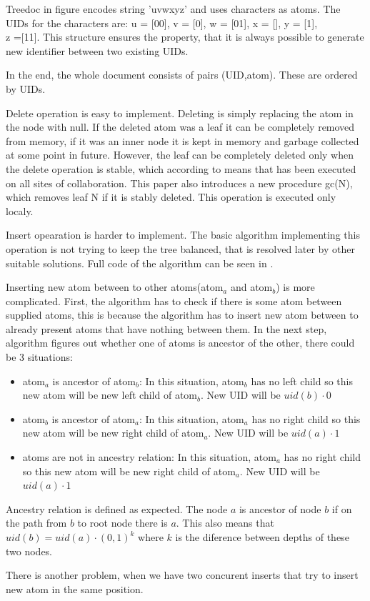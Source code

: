 \documentclass[12pt,oneside]{fithesis2}
\begin{document}
\par Treedoc in figure encodes string 'uvwxyz' and uses characters as atoms. The UIDs for the characters are: u = [00], v = [0], w = [01], x = [], y = [1],\\z =[11]. This structure ensures the property, that it is always possible to generate new identifier between two existing UIDs. 
\par In the end, the whole document consists of pairs (UID,atom). These are ordered by UIDs.  
\par Delete operation is easy to implement. Deleting is simply replacing the atom in the node with null. If the deleted atom was a leaf it can be completely removed from memory, if it was an inner node it is kept in memory and garbage collected at some point in future. However, the leaf can be completely deleted only when the delete operation is stable, which according to \cite{Shapiro-design} means that has been executed on all sites of collaboration. This paper also introduces a new procedure gc(N), which removes leaf N if it is stably deleted. This operation is executed only localy.
\par Insert opearation is harder to implement. The basic algorithm implementing this operation is not trying to keep the tree balanced, that is resolved later by other suitable solutions. Full code of the algorithm can be seen in \cite{Shapiro-design} \cite{Shapiro-editing}. 
\par Inserting new atom between to other atoms(atom\(_a\) and atom\(_b\)) is more complicated. First, the algorithm has to check if there is some atom between supplied atoms, this is because the algorithm has to insert new atom between to already present atoms that have nothing between them.
In the next step, algorithm figures out whether one of atoms is ancestor of the other, there could be 3 situations:
\begin{itemize}
\item atom\(_a\) is ancestor of atom\(_b\): In this situation, atom\(_b\) has no left child so this new atom will be new left child of atom\(_b\). New UID will be \(uid(b) \cdot 0\)
\item atom\(_b\) is ancestor of atom\(_a\): In this situation, atom\(_a\) has no right child so this new atom will be new right child of atom\(_a\). New UID will be \(uid(a) \cdot 1\)
\item atoms are not in ancestry relation:  In this situation, atom\(_a\) has no right child so this new atom will be new right child of atom\(_a\). New UID will be \(uid(a) \cdot 1\)
\end{itemize}
\par Ancestry relation is defined as expected. The node \(a\) is ancestor of node \(b\) if on the path from \(b\) to root node there is \(a\). This also means that \( uid(b) = uid(a) \cdot (0,1)^k \) where \(k\) is the diference between depths of these two nodes.
\par There is another problem, when we have two concurent inserts that try to insert new atom in the same position.
\end{document}
